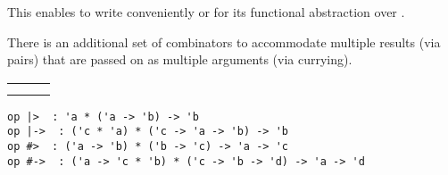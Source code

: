 \begin{isabellebody}
\begin{isamarkuptext}
  This enables to write conveniently  or
   for its functional abstraction over .

  \medskip There is an additional set of combinators to accommodate
  multiple results (via pairs) that are passed on as multiple
  arguments (via currying).

  \medskip
  \begin{tabular}{lll}
  \isa{{\isacharparenleft}x{\isacharcomma}\ y{\isacharparenright}\ {\isacharbar}{\isacharminus}{\isachargreater}\ f} & \isa{{\isasymequiv}} & \isa{f\ x\ y} \\
  \isa{f\ {\isacharhash}{\isacharminus}{\isachargreater}\ g} & \isa{{\isasymequiv}} & \isa{x\ {\isacharbar}{\isachargreater}\ f\ {\isacharbar}{\isacharminus}{\isachargreater}\ g} \\
  \end{tabular}
  \medskip%
\end{isamarkuptext}%
\isamarkuptrue%
%
\isadelimmlref
%
\endisadelimmlref
%
\isatagmlref
%
\begin{isamarkuptext}%
\begin{mldecls}
  \verb|op |\verb,|,\verb|>  : 'a * ('a -> 'b) -> 'b| \\
  \verb|op |\verb,|,\verb|->  : ('c * 'a) * ('c -> 'a -> 'b) -> 'b| \\
  \verb|op #>  : ('a -> 'b) * ('b -> 'c) -> 'a -> 'c| \\
  \verb|op #->  : ('a -> 'c * 'b) * ('c -> 'b -> 'd) -> 'a -> 'd| \\
  \end{mldecls}


\end{isamarkuptext}
\end{isabellebody}
